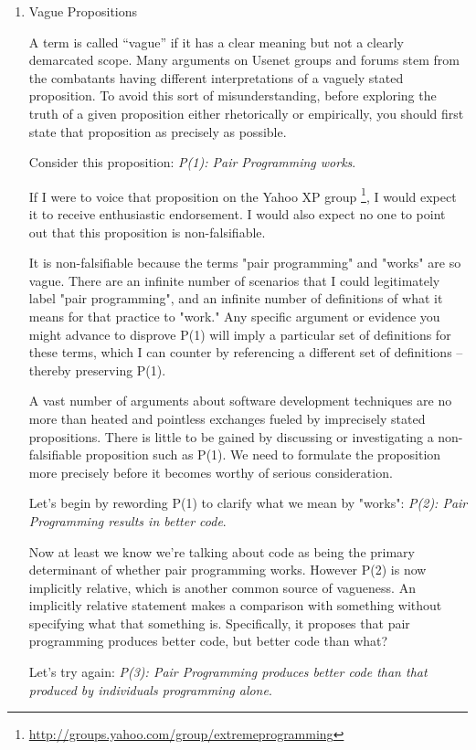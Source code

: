 \documentclass{article}
\begin{document}
\begin{enumerate}
\item Vague Propositions
\label{sec:orgheadline361}

A term is called “vague” if it has a clear meaning but not a clearly
demarcated scope. Many arguments on Usenet groups and forums stem from
the combatants having different interpretations of a vaguely stated
proposition. To avoid this sort of misunderstanding, before exploring
the truth of a given proposition either rhetorically or empirically, you
should first state that proposition as precisely as possible.

Consider this proposition: \emph{P(1): Pair Programming works}.

If I were to voice that proposition on the Yahoo XP group \footnote{\url{http://groups.yahoo.com/group/extremeprogramming}}, I would
expect it to receive enthusiastic endorsement. I would also expect no
one to point out that this proposition is non-falsifiable.

It is non-falsifiable because the terms "pair programming" and "works"
are so vague. There are an infinite number of scenarios that I could
legitimately label "pair programming", and an infinite number of
definitions of what it means for that practice to "work." Any specific
argument or evidence you might advance to disprove P(1) will imply a
particular set of definitions for these terms, which I can counter by
referencing a different set of definitions -- thereby preserving P(1).

A vast number of arguments about software development techniques are no
more than heated and pointless exchanges fueled by imprecisely stated
propositions. There is little to be gained by discussing or
investigating a non-falsifiable proposition such as P(1). We need to
formulate the proposition more precisely before it becomes worthy of
serious consideration.

Let's begin by rewording P(1) to clarify what we mean by "works": \emph{P(2):
Pair Programming results in better code}.

Now at least we know we're talking about code as being the primary
determinant of whether pair programming works. However P(2) is now
implicitly relative, which is another common source of vagueness. An
implicitly relative statement makes a comparison with something without
specifying what that something is. Specifically, it proposes that pair
programming produces better code, but better code than what?

Let's try again: \emph{P(3): Pair Programming produces better code than that
produced by individuals programming alone}.


\end{enumerate}
\end{document}
